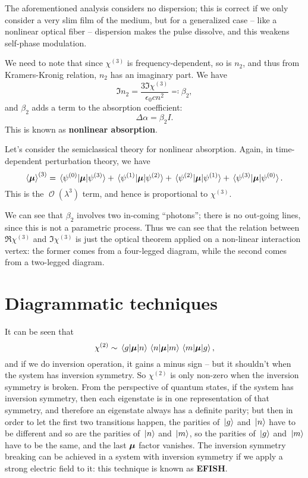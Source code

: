 \documentclass[hyperref, a4paper]{article}
\DeclareMathOperator{\bigO}{\mathcal{O}}
\newcommand*{\concept}[1]{{\textbf{#1}}}
\newcommand*{\chitwo}{\chi^{(2)}}
\newcommand*{\chithree}{\chi^{(3)}}
\begin{document}
The aforementioned analysis considers no dispersion; 
this is correct if we only consider a very slim film of the medium,
but for a generalized case -- like a nonlinear optical fiber -- 
dispersion makes the pulse dissolve, 
and this weakens self-phase modulation. 

We need to note that since $\chithree$ is frequency-dependent, 
so is $n_2$, and thus from Kramers-Kronig relation, 
$n_2$ has an imaginary part. 
We have 
\begin{equation}
    \Im n_2 = \frac{3 \Im \chithree}{\epsilon_0 c n^2} \eqqcolon \beta_2,
\end{equation} 
and $\beta_2$ adds a term to the absorption coefficient:
\begin{equation}
    \Delta \alpha = \beta_2 I.
\end{equation}
This is known as \concept{nonlinear absorption}.

Let's consider the semiclassical theory for nonlinear absorption.
Again, in time-dependent perturbation theory, we have 
\begin{equation}
    \expval{\vb*{\mu}}^{(3)} = \mel*{\psi^{(0)}}{\vb*{\mu}}{\psi^{(3)}}  
    + \mel*{\psi^{(1)}}{\vb*{\mu}}{\psi^{(2)}}  
    + \mel*{\psi^{(2)}}{\vb*{\mu}}{\psi^{(1)}}  
    + \mel*{\psi^{(3)}}{\vb*{\mu}}{\psi^{(0)}}  .
\end{equation}
This is the $\bigO(\lambda^3)$ term, 
and hence is proportional to $\chithree$.

We can see that $\beta_2$ involves two in-coming ``photons''; 
there is no out-going lines, 
since this is not a parametric process.
Thus we can see that the relation between $\Re \chithree$ 
and $\Im \chithree$ is just the optical theorem applied on a non-linear interaction vertex:
the former comes from a four-legged diagram, 
while the second comes from a two-legged diagram.

\section{Diagrammatic techniques}

It can be seen that 
\begin{equation}
    \chitwo \sim \mel*{g}{\vb*{\mu}}{n} \mel*{n}{ \vb*{\mu}}{m} \mel*{m}{\vb*{\mu}}{g},
\end{equation}
and if we do inversion operation, 
it gains a minus sign -- but it shouldn't when the system has inversion symmetry.
So $\chitwo$ is only non-zero when the inversion symmetry is broken.
From the perspective of quantum states, 
if the system has inversion symmetry, 
then each eigenstate is in one representation of that symmetry, 
and therefore an eigenstate always has a definite parity; 
but then in order to let the first two transitions happen, 
the parities of $\ket*{g}$ and $\ket*{n}$ have to be different 
and so are the parities of $\ket*{n}$ and $\ket*{m}$,
so the parities of $\ket*{g}$ and $\ket*{m}$ have to be the same, 
and the last $\vb*{\mu}$ factor vanishes.
The inversion symmetry breaking can be achieved in a system with inversion symmetry 
if we apply a strong electric field to it:
this technique is known as \concept{EFISH}.
\end{document}
